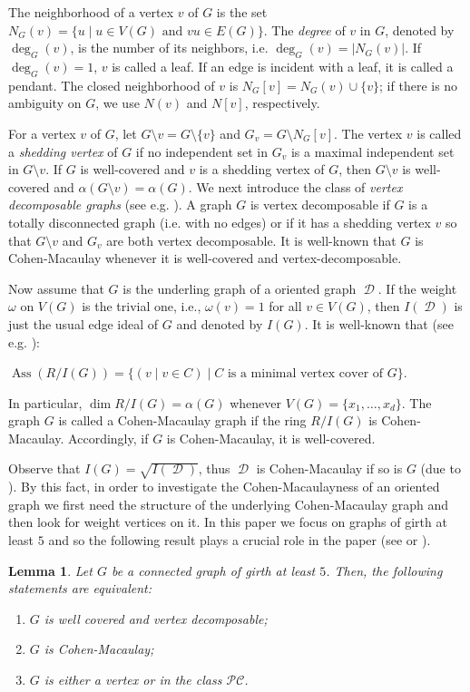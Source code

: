 \documentclass[12pt, amscd]{amsart}
\newtheorem{lem}[thm]{Lemma}
\theoremstyle{definition}
\DeclareMathOperator{\ass}{Ass}
\DeclareMathOperator{\D}{\mathcal{D}}
\newcommand{\0}{\bold{0}}
\begin{document}
The neighborhood of a vertex $v$ of $G$ is the set $N_G(v) = \{u \mid u \in V(G) \text{ and } vu\in E(G)\}$. The {\it degree} of $v$ in $G$, denoted by $\deg_G(v)$, is the number of its neighbors, i.e. $\deg_G(v) = |N_G(v)|$. If $\deg_G(v) = 1$, $v$ is called a leaf. If an edge is incident with a leaf, it is called a pendant. The closed neighborhood of $v$ is  $N_G[v] = N_G(v) \cup \{v\}$; if there is no ambiguity on $G$, we use $N(v)$ and $N[v]$, respectively. 

For a vertex $v$ of $G$, let $G\setminus v = G\setminus\{v\}$ and $G_v=G\setminus N_G[v]$.  The vertex $v$ is called a {\it shedding vertex} of $G$ if no independent set in $G_v$ is a maximal independent set in $G\setminus v$. If $G$ is well-covered and $v$ is a shedding vertex of $G$, then $G\setminus v$ is well-covered and $\alpha(G\setminus v) =\alpha(G)$.  We next introduce the class of {\it vertex decomposable graphs} (see e.g. \cite{W}).  A graph $G$ is vertex decomposable  if $G$ is a totally disconnected graph (i.e. with no edges) or if it has a shedding vertex $v$ so that $G\setminus v$ and $G_v$ are both vertex decomposable. It is well-known that $G$ is Cohen-Macaulay whenever it is well-covered and vertex-decomposable.

Now assume that $G$ is the underling graph of a oriented graph $\D$. If the weight $\omega$ on $V(G)$ is the trivial one, i.e., $\omega(v)=1$ for all $v\in V(G)$, then $I(\D)$ is just the usual edge ideal of $G$ and denoted by $I(G)$. It is well-known that (see e.g. \cite[Proposition 6.1.16]{Vi}):

\centerline{$\ass(R/I(G)) = \{(v\mid v \in C) \mid C \text{ is a minimal vertex cover of } G\}.$}
\medskip

\noindent In particular,  $\dim R/I(G) = \alpha(G)$ whenever $V(G)=\{x_1,\ldots,x_d\}$. The graph  $G$ is called a Cohen-Macaulay graph if the ring $R/I(G)$ is Cohen-Macaulay. Accordingly,  if $G$ is Cohen-Macaulay, it is well-covered.

Observe that $I(G)=\sqrt{I(\D)}$, thus $\D$ is Cohen-Macaulay if so is $G$ (due to \cite[Theorem 2.6]{HTT}). By this fact, in order to investigate the Cohen-Macaulayness of an oriented graph we first need the structure of the underlying Cohen-Macaulay graph and then look for weight vertices on it. In this paper we focus on graphs of girth at least $5$ and so the following result plays a crucial role in the paper (see \cite[Theorem 20]{BC} or \cite[Theorem 2.4]{HMT}).

\begin{lem}  \label{HMT} Let $G$ be a connected graph of girth at least $5$. Then, the following statements are equivalent:
\begin{enumerate}
\item $G$ is well covered and vertex decomposable;
\item $G$ is Cohen-Macaulay;
\item $G$ is either a vertex or in the class $\mathcal{PC}$.
\end{enumerate}
\end{lem}
\end{document}
